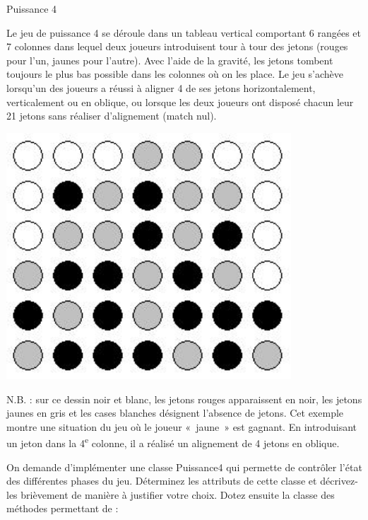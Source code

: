\begin{Exercice}{Puissance 4}

	Le jeu de puissance 4 se déroule dans un tableau vertical comportant 6
	rangées et 7 colonnes dans lequel deux joueurs introduisent tour à tour
	des jetons (rouges pour l’un, jaunes pour l’autre). Avec l’aide de la
	gravité, les jetons tombent toujours le plus bas possible dans les
	colonnes où on les place. Le jeu s’achève lorsqu’un des joueurs a
	réussi à aligner 4 de ses jetons horizontalement, verticalement ou en
	oblique, ou lorsque les deux joueurs ont disposé chacun leur 21 jetons
	sans réaliser d’alignement (match nul).

	\begin{minipage}[t][][b]{4cm}
	\includegraphics[width=0.8\textwidth]{image/puissance4}
	\end{minipage}
	\begin{minipage}[t][][b]{10cm}
	N.B. : sur ce dessin noir et
	blanc, les jetons rouges apparaissent en noir, les jetons jaunes en
	gris et les cases blanches désignent l'absence de
	jetons. Cet exemple montre une situation du jeu où le joueur «~jaune~»
	est gagnant. En introduisant un jeton dans la
	4\textsuperscript{e} colonne,
	il a réalisé un alignement de 4 jetons en oblique.
	\end{minipage}
	
	On demande d’implémenter une classe Puissance4 qui permette de contrôler
	l’état des différentes phases du jeu. Déterminez les attributs de cette
	classe et décrivez-les brièvement de manière à justifier votre choix.
	Dotez ensuite la classe des méthodes permettant de :


\end{Exercice}
